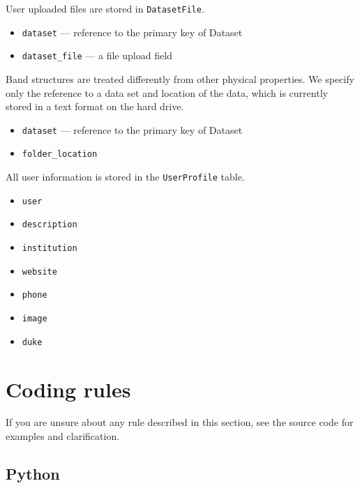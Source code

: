 \documentclass{article}
\begin{document}
User uploaded files are stored in \texttt{DatasetFile}.
\begin{tcolorbox}[colback=green!5,colframe=green!40!black,title=DatasetFile(Base)]
  \begin{itemize}
  \item \texttt{dataset} --- reference to the primary key of Dataset
  \item \texttt{dataset\_file} --- a file upload field
  \end{itemize}
\end{tcolorbox}

Band structures are treated differently from other physical properties. We specify only the reference to a data set and location of the data, which is currently stored in a text format on the hard drive.
\begin{tcolorbox}[colback=green!5,colframe=green!40!black,title=BandStructure(Base)]
  \begin{itemize}
  \item \texttt{dataset} --- reference to the primary key of Dataset
  \item \texttt{folder\_location}
  \end{itemize}
\end{tcolorbox}

All user information is stored in the \texttt{UserProfile} table.
\begin{tcolorbox}[colback=green!5,colframe=green!40!black,title=UserProfile]
  \begin{itemize}
  \item \texttt{user}
  \item \texttt{description}
  \item \texttt{institution}
  \item \texttt{website}
  \item \texttt{phone}
  \item \texttt{image}
  \item \texttt{duke}
  \end{itemize}
\end{tcolorbox}

\section{Coding rules}

If you are unsure about any rule described in this section, see the source code for examples and clarification.

\subsection{Python}
\end{document}
